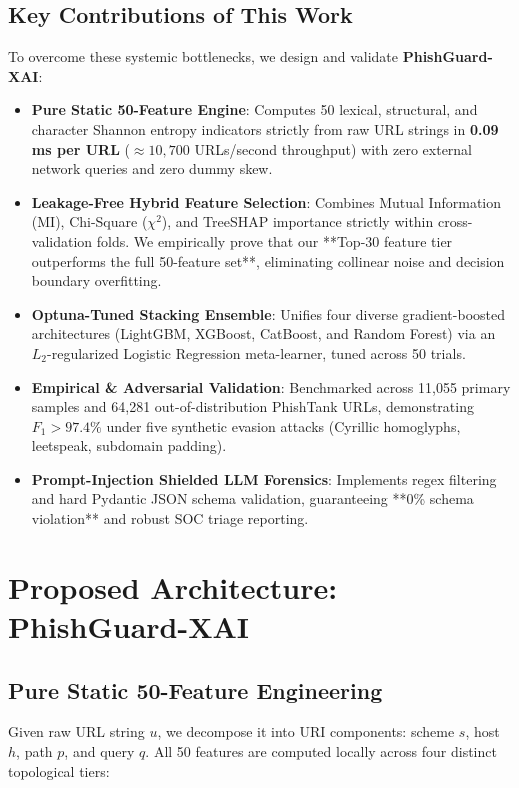 \documentclass[conference]{IEEEtran}
\begin{document}
\subsection{Key Contributions of This Work}
To overcome these systemic bottlenecks, we design and validate \textbf{PhishGuard-XAI}:
\begin{itemize}
    \item \textbf{Pure Static 50-Feature Engine}: Computes 50 lexical, structural, and character Shannon entropy indicators strictly from raw URL strings in \textbf{0.09\,ms per URL} ($\approx 10,700$ URLs/second throughput) with zero external network queries and zero dummy skew.
    \item \textbf{Leakage-Free Hybrid Feature Selection}: Combines Mutual Information (MI), Chi-Square ($\chi^2$), and TreeSHAP importance strictly within cross-validation folds. We empirically prove that our **Top-30 feature tier outperforms the full 50-feature set**, eliminating collinear noise and decision boundary overfitting.
    \item \textbf{Optuna-Tuned Stacking Ensemble}: Unifies four diverse gradient-boosted architectures (LightGBM, XGBoost, CatBoost, and Random Forest) via an $L_2$-regularized Logistic Regression meta-learner, tuned across 50 trials.
    \item \textbf{Empirical \& Adversarial Validation}: Benchmarked across 11,055 primary samples and 64,281 out-of-distribution PhishTank URLs, demonstrating $F_1 > 97.4\%$ under five synthetic evasion attacks (Cyrillic homoglyphs, leetspeak, subdomain padding).
    \item \textbf{Prompt-Injection Shielded LLM Forensics}: Implements regex filtering and hard Pydantic JSON schema validation, guaranteeing **0\% schema violation** and robust SOC triage reporting.
\end{itemize}

\section{Proposed Architecture: PhishGuard-XAI}

\subsection{Pure Static 50-Feature Engineering}
Given raw URL string $u$, we decompose it into URI components: scheme $s$, host $h$, path $p$, and query $q$. All 50 features are computed locally across four distinct topological tiers:
\end{document}
